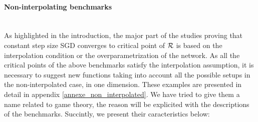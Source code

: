 \paragraph{Non-interpolating benchmarks}
~~\\
As highlighted in the introduction, the major part of the studies proving that constant step size SGD converges to critical point of $\mathcal{R}$ is based on the interpolation condition or
the overparametrization of the network. As all the critical points of the above benchmarks satisfy the interpolation assumption, it is necessary to suggest new functions taking
into account all the possible setups in the non-interpolated case, in one dimension. These examples are presented in detail in appendix \ref{annexe_non_interpolated}. 
We have tried to give them a name related to game theory, the reason will be explicited with the descriptions of the benchmarks. 
Succintly, we present their caracteristics below:
